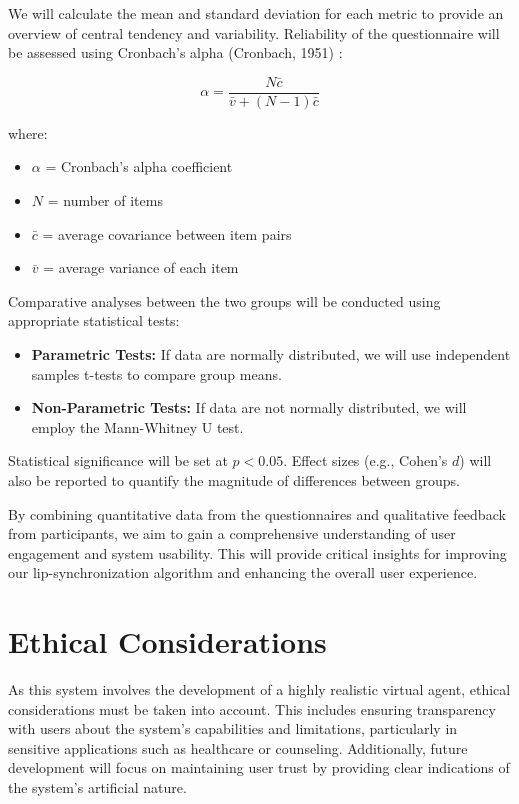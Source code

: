 \documentclass[12pt]{article}
\begin{document}
We will calculate the mean and standard deviation for each metric to provide an overview of central tendency and variability. Reliability of the questionnaire will be assessed using Cronbach's alpha (Cronbach, 1951) \cite{Cronbach1951CoefficientTests}:

\[
\alpha = \frac{N \bar{c}}{\bar{v} + (N - 1)\bar{c}}
\]

where:

\begin{itemize}
    \item \( \alpha \) = Cronbach's alpha coefficient
    \item \( N \) = number of items
    \item \( \bar{c} \) = average covariance between item pairs
    \item \( \bar{v} \) = average variance of each item
\end{itemize}

Comparative analyses between the two groups will be conducted using appropriate statistical tests:

\begin{itemize}
    \item \textbf{Parametric Tests:} If data are normally distributed, we will use independent samples t-tests to compare group means.
    \item \textbf{Non-Parametric Tests:} If data are not normally distributed, we will employ the Mann-Whitney U test.
\end{itemize}

Statistical significance will be set at \( p < 0.05 \). Effect sizes (e.g., Cohen's \( d \)) will also be reported to quantify the magnitude of differences between groups.

By combining quantitative data from the questionnaires and qualitative feedback from participants, we aim to gain a comprehensive understanding of user engagement and system usability. This will provide critical insights for improving our lip-synchronization algorithm and enhancing the overall user experience.

\section{Ethical Considerations}

As this system involves the development of a highly realistic virtual agent, ethical considerations must be taken into account. This includes ensuring transparency with users about the system's capabilities and limitations, particularly in sensitive applications such as healthcare or counseling. Additionally, future development will focus on maintaining user trust by providing clear indications of the system's artificial nature.



\end{document}
